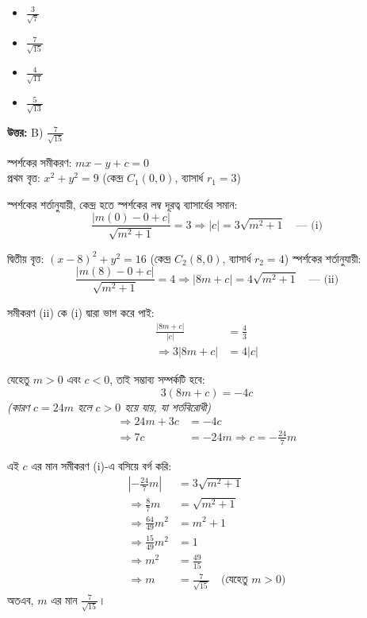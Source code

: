 \documentclass[12pt, a4paper]{article}
\begin{document}
\vspace{1em}
\begin{itemize}[label={}, leftmargin=1cm, itemsep=0.5em]
    \item[\textbf{A)}] $\frac{3}{\sqrt{7}}$
    \item[\textbf{B)}] $\frac{7}{\sqrt{15}}$
    \item[\textbf{C)}] $\frac{4}{\sqrt{11}}$
    \item[\textbf{D)}] $\frac{5}{\sqrt{13}}$
\end{itemize}

\vspace{0.5em}
\begin{tcolorbox}[answerbox]
    \textbf{\color{success} উত্তর:} B) $\frac{7}{\sqrt{15}}$
\end{tcolorbox}
\vspace{1em}

\begin{tcolorbox}[solutionbox={সমাধান (Solution)}]
    \noindent
    স্পর্শকের সমীকরণ: $mx - y + c = 0$ \\
    প্রথম বৃত্ত: $x^2 + y^2 = 9$ (কেন্দ্র $C_1(0, 0)$, ব্যাসার্ধ $r_1 = 3$) 
    
    স্পর্শকের শর্তানুযায়ী, কেন্দ্র হতে স্পর্শকের লম্ব দূরত্ব ব্যাসার্ধের সমান:
    \[ \frac{|m(0) - 0 + c|}{\sqrt{m^2 + 1}} = 3 \Rightarrow |c| = 3\sqrt{m^2 + 1} \quad \text{--- (i)} \]
    
    দ্বিতীয় বৃত্ত: $(x - 8)^2 + y^2 = 16$ (কেন্দ্র $C_2(8, 0)$, ব্যাসার্ধ $r_2 = 4$) 
    স্পর্শকের শর্তানুযায়ী:
    \[ \frac{|m(8) - 0 + c|}{\sqrt{m^2 + 1}} = 4 \Rightarrow |8m + c| = 4\sqrt{m^2 + 1} \quad \text{--- (ii)} \]
    
    সমীকরণ (ii) কে (i) দ্বারা ভাগ করে পাই:
    \begin{align*}
        \frac{|8m + c|}{|c|} &= \frac{4}{3} \\
        \Rightarrow 3|8m + c| &= 4|c|
    \end{align*}
    
    যেহেতু $m > 0$ এবং $c < 0$, তাই সম্ভাব্য সম্পর্কটি হবে:
    \[ 3(8m + c) = -4c \]
    \textit{(কারণ $c = 24m$ হলে $c > 0$ হয়ে যায়, যা শর্তবিরোধী)}
    \begin{align*}
        \Rightarrow 24m + 3c &= -4c \\
        \Rightarrow 7c &= -24m \Rightarrow c = -\frac{24}{7}m
    \end{align*}
    
    এই $c$ এর মান সমীকরণ (i)-এ বসিয়ে বর্গ করি:
    \begin{align*}
        \left|-\frac{24}{7}m\right| &= 3\sqrt{m^2 + 1} \\
        \Rightarrow \frac{8}{7}m &= \sqrt{m^2 + 1} \\
        \Rightarrow \frac{64}{49}m^2 &= m^2 + 1 \\
        \Rightarrow \frac{15}{49}m^2 &= 1 \\
        \Rightarrow m^2 &= \frac{49}{15} \\
        \Rightarrow m &= \frac{7}{\sqrt{15}} \quad \text{(যেহেতু } m > 0\text{)}
    \end{align*}
    অতএব, $m$ এর মান \textbf{$\frac{7}{\sqrt{15}}$}।
\end{tcolorbox}
\end{document}
